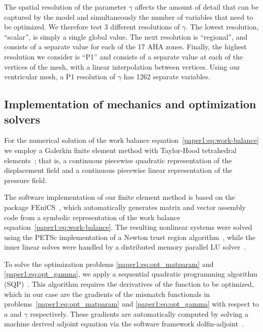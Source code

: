The spatial resolution of the parameter $\gamma$ affects the amount of detail
that can be captured by the model and simultaneously
the number of variables that need to be optimized. We therefore test 3 different resolutions of $\gamma$.
The lowest resolution, ``scalar'', is simply a single global value.  The next resolution
is ``regional'', and consists of a separate value for each of the 17 AHA zones. Finally, the highest resolution
we consider is ``P1'' and consists of a separate value at each of the vertices of the mesh,
with a linear interpolation between vertices. Using our ventricular mesh, a P1 resolution of $\gamma$ has 1262 separate variables.


\subsection{Implementation of mechanics and optimization solvers}
For the numerical solution of the work balance equation~\eqref{paper1:eq:work-balance} we employ a
Galerkin finite element method with Taylor-Hood tetrahedral
elements~\cite{hood1974navier}; that is, a continuous piecewise
quadratic representation of the displacement field and a continuous
piecewise linear representation of the pressure field.  

The software implementation of our finite element method is based on
the package FEniCS~\cite{LoggMardalEtAl2011a}, which automatically
generates matrix and vector assembly code from a symbolic
representation of the work balance equation~\eqref{paper1:eq:work-balance}.
The resulting nonlinear systems were solved using the PETSc
implementation of a Newton trust region algorithm~\cite{PETScPackage},
while the inner linear solves were handled by a distributed memory
parallel LU solver~\cite{lidemmel03}.

To solve the optimization problems \eqref{paper1:eq:opt_matparam} and
\eqref{paper1:eq:opt_gamma}, we apply a sequential quadratic programming
algorithm (SQP)~\cite{kraft1988software}. This algorithm requires the
derivatives of the function to be optimized, which in our case are the
gradients of the mismatch functionals in
problems~\eqref{paper1:eq:opt_matparam} and \eqref{paper1:eq:opt_gamma} with respect
to $a$ and $\gamma$ respectively. These gradients are
automatically computed by solving a machine derived adjoint equation via the
software framework dolfin-adjoint~\cite{farrell2013automated}.

